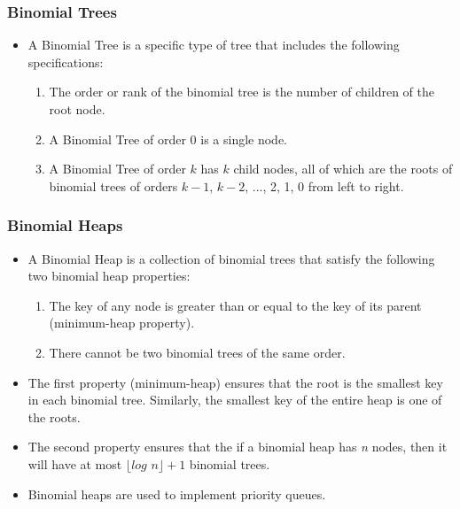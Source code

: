 \documentclass[13pt]{beamer}
\begin{document}
\begin{frame}
\frametitle{Binomial Trees}
  \begin{itemize}
    \item A \alert{Binomial Tree} is a specific type of tree that includes the following specifications:
          \begin{enumerate}
            \item The \alert{order} or \alert{rank} of the binomial tree is the number of children of the root node.
            \item A Binomial Tree of order $0$ is a single node.
            \item A Binomial Tree of order $k$ has $k$ child nodes, all of which are the roots of binomial trees of orders $k - 1$, $k - 2$, ..., 2, 1, 0 from left to right.
          \end{enumerate}
  \end{itemize}
\end{frame}

\begin{frame}
\frametitle{Binomial Heaps}
  \begin{itemize}
    \item A \alert{Binomial Heap} is a collection of binomial trees that satisfy the following two binomial heap properties:
      \begin{enumerate}
        \item The key of any node is greater than or equal to the key of its parent (minimum-heap property).
        \item There cannot be two binomial trees of the same order.
      \end{enumerate}
    \item The first property (minimum-heap) ensures that the root is the smallest key in each binomial tree. Similarly, the smallest key of the entire heap is one of the roots.
    \item The second property ensures that the if a binomial heap has \textit{n} nodes, then it will have at most $\lfloor \textit{log n} \rfloor + 1$ binomial trees.
    \item Binomial heaps are used to implement priority queues.
  \end{itemize}
\end{frame}
\end{document}
